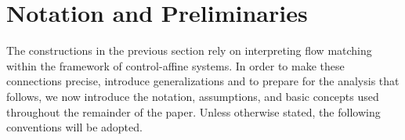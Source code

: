 \documentclass{article}
\newcommand{\Rd}{\mathbb{R}^d}
\newcommand{\R}{\mathbb{R}}
\begin{document}
    
  





\section{Notation and Preliminaries}
The constructions in the previous section rely on interpreting 
flow matching within the framework of control-affine systems. 
In order to make these connections precise, introduce generalizations and to prepare for the 
analysis that follows, we now introduce the notation, assumptions, 
and basic concepts used throughout the remainder of the paper. 
Unless otherwise stated, the following conventions will be adopted.
\end{document}
